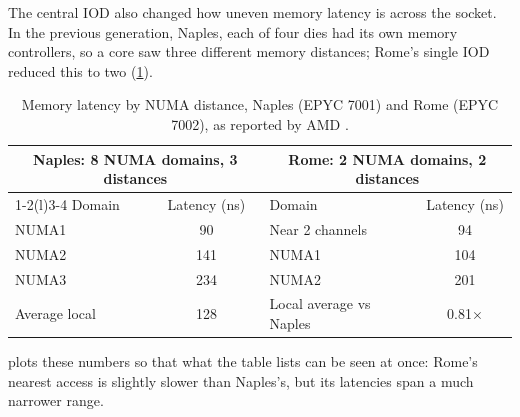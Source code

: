 The central IOD also changed how uneven memory latency is across the socket. In the previous generation, Naples, each of four dies had its own memory controllers, so a core saw three different memory distances; Rome's single IOD reduced this to two (\cref{tab:numa-latency}).

\begin{table}[htbp]
  \centering
  \caption[Memory latency by NUMA distance, Naples and Rome, as reported by AMD]{Memory latency by NUMA distance, Naples (EPYC 7001) and Rome (EPYC 7002), as reported by AMD \cite[Fig.~2.2.6]{naffziger2020chiplet}.}
  \label{tab:numa-latency}
  \small
  \begin{tabular}{@{}lclc@{}}
    \toprule
    \multicolumn{2}{c}{\textbf{Naples: 8 NUMA domains, 3 distances}} & \multicolumn{2}{c}{\textbf{Rome: 2 NUMA domains, 2 distances}} \\
    \cmidrule(r){1-2}\cmidrule(l){3-4}
    Domain & Latency (ns) & Domain & Latency (ns) \\
    \midrule
    NUMA1 & 90 & Near 2 channels & 94 \\
    NUMA2 & 141 & NUMA1 & 104 \\
    NUMA3 & 234 & NUMA2 & 201 \\
    Average local & 128 & Local average vs Naples & 0.81$\times$ \\
    \bottomrule
  \end{tabular}
\end{table}
 plots these numbers so that what the table lists can be seen at once: Rome's nearest access is slightly slower than Naples's, but its latencies span a much narrower range.


